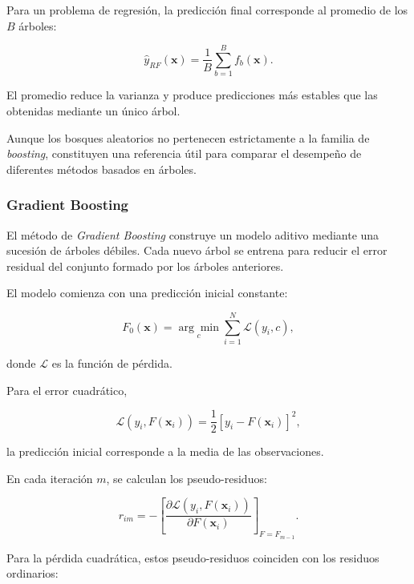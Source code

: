 Para un problema de regresión, la predicción final corresponde al promedio de los $B$ árboles:

\begin{equation}
\hat{y}_{RF}(\mathbf{x})
=
\frac{1}{B}
\sum_{b=1}^{B}
f_b(\mathbf{x}).
\end{equation}

El promedio reduce la varianza y produce predicciones más estables que las obtenidas mediante un único árbol.

Aunque los bosques aleatorios no pertenecen estrictamente a la familia de \textit{boosting}, constituyen una referencia útil para comparar el desempeño de diferentes métodos basados en árboles.

\subsubsection{Gradient Boosting}

El método de \textit{Gradient Boosting} construye un modelo aditivo mediante una sucesión de árboles débiles. Cada nuevo árbol se entrena para reducir el error residual del conjunto formado por los árboles anteriores.

El modelo comienza con una predicción inicial constante:

\begin{equation}
F_0(\mathbf{x})
=
\underset{c}{\arg\min}
\sum_{i=1}^{N}
\mathcal{L}(y_i,c),
\end{equation}

donde $\mathcal{L}$ es la función de pérdida.

Para el error cuadrático,

\begin{equation}
\mathcal{L}(y_i,F(\mathbf{x}_i))
=
\frac{1}{2}
\left[
y_i-F(\mathbf{x}_i)
\right]^2,
\end{equation}

la predicción inicial corresponde a la media de las observaciones.

En cada iteración $m$, se calculan los pseudo-residuos:

\begin{equation}
r_{im}
=
-
\left[
\frac{
\partial
\mathcal{L}
\left(
y_i,F(\mathbf{x}_i)
\right)
}
{
\partial F(\mathbf{x}_i)
}
\right]_{F=F_{m-1}}.
\end{equation}

Para la pérdida cuadrática, estos pseudo-residuos coinciden con los residuos ordinarios:


